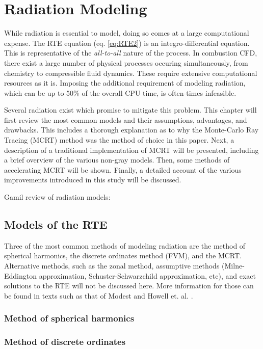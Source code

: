\addchapheadtotoc
\chapter{Radiation Modeling}\label{chapter:Modeling}
While radiation is essential to model, doing so comes at a large computational expense. 
The RTE equation (eq. \ref{eq:RTE2}) is an integro-differential equation. This is representative of the \textit{all-to-all} nature of the process. In combustion CFD, there exist a large number of physical processes occuring simultaneously, from chemistry to compressible fluid dynamics. 
These require extensive computational resources as it is. Imposing the additional requirement of modeling radiation, which can be up to 50\% of the overall CPU time, is often-times infeasible.

Several radiation exist which promise to mitigate this problem. This chapter will first review the most common models and their assumptions, advantages, and drawbacks. 
This includes a thorough explanation as to why the Monte-Carlo Ray Tracing (MCRT) method was the method of choice in this paper.
Next, a description of a traditional implementation of MCRT will be presented, including a brief overview of the various non-gray models.
Then, some methods of accelerating MCRT will be shown.
Finally, a detailed account of the various improvements introduced in this study will be discussed.

Gamil review of radiation models: \cite{Gamil2020AssessmentChamber}

\section{Models of the RTE}
Three of the most common methods of modeling radiation are the method of spherical harmonics, the discrete ordinates method (FVM), and the MCRT. Alternative methods, such as the zonal method, assumptive methods (Milne-Eddington approximation, Schuster-Schwarzchild approximation, etc), and exact solutions to the RTE will not be discussed here.
More information for those can be found in texts such as that of Modest \cite{Modest2013RadiativeTransfer} and Howell et. al. \cite{Howell2010ThermalTransfer}.

\subsection{Method of spherical harmonics}
\subsection{Method of discrete ordinates}
